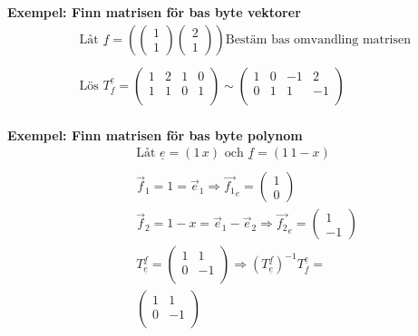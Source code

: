 \begin{multicols}{2}
\textbf{Exempel: Finn matrisen för bas byte vektorer} %
\begin{align*}
  &\quad  \text{Låt } \underline{f} =
  \left( \begin{pmatrix} 1 \\ 1 \end{pmatrix} \begin{pmatrix} 2 \\ 1 \end{pmatrix} \right)
  \text{Bestäm bas omvandling matrisen }   \\
  &\quad  \\
  &\quad  \text{Lös } T^{\underline{e}}_{\underline{f}} = 
  \left(\begin{array}{cc|cc}
    1 & 2 & 1 & 0  \\
    1 & 1 & 0 & 1  \\
  \end{array}\right) \sim
    \left(\begin{array}{cc|cc}
    1 & 0 & -1 &  2  \\
    0 & 1 &  1 & -1  \\
  \end{array}\right) \\
\end{align*}

\textbf{Exempel: Finn matrisen för bas byte polynom}
\begin{align*}
  &\quad  \text{Låt } \underline{e}=(1 \, x) \text{ och } \underline{f}=(1 \, 1-x) \\
  &\quad  \\
  &\quad  \vec{f}_1 = 1 = \vec{e}_1 \Rightarrow \vec{f_1}_e = \begin{pmatrix} 1 \\ 0 \end{pmatrix} \\
  &\quad  \vec{f}_2 = 1-x = \vec{e}_1 - \vec{e}_2 \Rightarrow \vec{f_2}_e = \begin{pmatrix} 1 \\ -1 \end{pmatrix} \\
  &\quad  T^{\underline{f}}_{\underline{e}} =
  \left(\begin{array}{cc}
    1 &  1  \\
    0 & -1  \\
  \end{array}\right) \Rightarrow{} {(T^{\underline{f}}_{\underline{e}})}^{-1} T^{\underline{e}}_{\underline{f}} = \\
  &\quad \left(\begin{array}{cc}
    1 &  1  \\
    0 & -1  \\
  \end{array}\right) \text{} \\
\end{align*}


\end{multicols}
